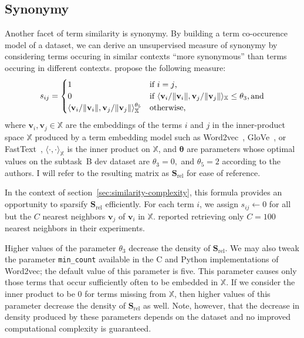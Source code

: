 \documentclass[
  digital, %
  notable, %
  lof,     %
  lot,     %
  nopalatino, color
]{fithesis3}
\begin{document}
\subsection{Synonymy}
Another facet of term similarity is
synonymy. By building a term co-occurence model of a dataset, we can derive
an unsupervised measure of synonymy by considering terms occuring in similar
contexts “more synonymous” than terms occuring in different contexts.
\textcite{charletdamnati17} propose the following measure:\begin{equation}
  s_{ij} = \begin{cases}
    1 & \text{if }i = j\textrm{,} \\
    0 & \text{if }\langle\mathbf v_i / \Vert\mathbf v_i\Vert, \mathbf v_j / \Vert\mathbf v_j\Vert\rangle_{\mathbb X}\leq\theta_3\textrm{,\,and} \\
    \langle\mathbf v_i / \Vert\mathbf v_i\Vert, \mathbf v_j / \Vert\mathbf v_j\Vert\rangle_{\mathbb X}^{\theta_5}\index{.h3@$\theta _3$}\index{.h5@$\theta_5$|emph}&\textrm{otherwise,}
  \end{cases}
\end{equation}
where $\mathbf v_i, \mathbf v_j\in\mathbb X$ are the embeddings of the terms $i$ and $j$ in the inner-product space $\mathbb X$ produced by
a term embedding model such as
Word2vec~\cite{mikolov2013efficient},
GloVe~\cite{pennington2014glove}, or
FastText~\cite{bojanowski2016enriching},
$\langle\cdot,\cdot\rangle_{\mathbb X}$ is the inner product on $\mathbb
X$, and $\bm\theta$ are parameters whose optimal
values on the subtask~B dev dataset are $\theta_3=0,$ and $\theta_5=2$
according to the authors. I will refer to the resulting matrix as $\mathbf
S_{\textrm{rel}}$ for ease of
reference.

In the context of section~\ref{sec:similarity-complexity}, this formula
provides an opportunity to sparsify $\mathbf
S_{\textrm{rel}}$ efficiently.
For each term $i$, we assign $s_{ij}\leftarrow 0$ for all but the
$C$ nearest neighbors $\mathbf v_j$ of $\mathbf v_i$ in $\mathbb X$.
\textcite{charletdamnati17} reported retrieving only $C=100$
nearest neighbors in their experiments.

Higher values of the parameter $\theta_3$ decrease the
density of $\mathbf S_{\textrm{rel}}$. We may
also tweak the parameter
\texttt{min\_count}
available in the C and Python implementations of Word2vec; the
default value of this parameter is five. This parameter causes only those terms
that occur sufficiently often to be embedded in $\mathbb X$.
If we consider the inner product to be $0$ for terms missing from $\mathbb
X$, then higher values of this parameter decrease the
density of $\mathbf S_{\textrm{rel}}$ as well. Note, however, that the decrease in
density produced by these parameters depends on the dataset and no improved
computational complexity is guaranteed.
\end{document}
